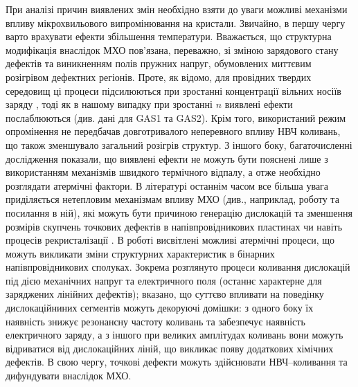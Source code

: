 При аналізі причин виявлених змін необхідно взяти до уваги можливі механізми впливу
мікрохвильового випромінювання на кристали.
Звичайно, в першу чергу варто врахувати ефекти збільшення температури.
Вважається, що  структурна модифікація внаслідок МХО пов'язана, переважно,
зі зміною зарядового стану дефектів та виникненням полів пружних напруг, обумовлених миттєвим розігрівом дефектних регіонів.
Проте, як відомо, для провідних твердих середовищ ці процеси підсилюються при зростанні концентрації вільних носіїв заряду \cite{MW:Rev}, тоді як в нашому випадку при зростанні $n$ виявлені ефекти послаблюються (див. дані для GAS1 та GAS2).
Крім того, використаний режим опромінення не передбачав довготривалого неперевного впливу НВЧ коливань, що також зменшувало загальний розігрів структур.
З іншого боку, багаточисленні дослідження показали, що виявлені ефекти не можуть бути пояснені лише з використанням механізмів швидкого термічного відпалу, а отже необхідно розглядати атермічні фактори.
В літературі останнім часом все більша увага приділяється нетепловим механізмам впливу МХО (див., наприклад, роботу \cite{MW:Si2018} та посилання в ній), які можуть бути причиною генерацію дислокацій та зменшення розмірів скупчень точкових дефектів в напівпровідникових пластинах \cite{Konakova2007JTF} чи навіть процесів рекристалізації \cite{MW:Si2018}.
В роботі \cite{Konakova2007JTF} висвітлені можливі атермічні процеси, що можуть викликати зміни структурних характеристик в бінарних напівпровідникових сполуках.
Зокрема розглянуто процеси коливання дислокацій під дією механічних напруг та електричного поля (останнє характерне для заряджених лінійних дефектів);
вказано, що суттєво впливати на поведінку дислокаційниних сегментів можуть декоруючі домішки:
з одного боку їх наявність знижує резонансну частоту коливань та забезпечує наявність електричного заряду,
а з іншого при великих амплітудах коливань вони можуть відриватися від дислокаційних ліній, що викликає появу додаткових хімічних дефектів.
В свою чергу, точкові дефекти можуть здійснювати НВЧ--коливання та дифундувати внаслідок МХО.



